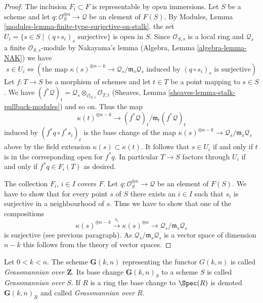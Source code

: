 \begin{proof}
\medskip\noindent
The inclusion $F_i \subset F$ is representable by open immersions.
Let $S$ be a scheme and let
$q : \mathcal{O}_S^{\oplus n} \to \mathcal{Q}$ be an element of
$F(S)$. By
Modules, Lemma \ref{modules-lemma-finite-type-surjective-on-stalk}.
the set $U_i = \{s \in S \mid (q \circ s_i)_s\text{ surjective}\}$
is open in $S$. Since $\mathcal{O}_{S, s}$ is a local ring
and $\mathcal{Q}_s$ a finite $\mathcal{O}_{S, s}$-module
by Nakayama's lemma (Algebra, Lemma \ref{algebra-lemma-NAK}) we have
$$
s \in U_i \Leftrightarrow
\left(
\text{the map }
\kappa(s)^{\oplus n - k} \to \mathcal{Q}_s/\mathfrak m_s\mathcal{Q}_s
\text{ induced by }
(q \circ s_i)_s
\text{ is surjective}
\right)
$$
Let $f : T \to S$ be a morphism of schemes and let $t \in T$ be a point
mapping to $s \in S$. We have
$(f^*\mathcal{Q})_t =
\mathcal{Q}_s \otimes_{\mathcal{O}_{S, s}} \mathcal{O}_{T, t}$
(Sheaves, Lemma \ref{sheaves-lemma-stalk-pullback-modules})
and so on. Thus the map
$$
\kappa(t)^{\oplus n - k} \to (f^*\mathcal{Q})_t/\mathfrak m_t(f^*\mathcal{Q})_t
$$
induced by $(f^*q \circ f^*s_i)_t$ is the base change of the map
$\kappa(s)^{\oplus n - k} \to \mathcal{Q}_s/\mathfrak m_s\mathcal{Q}_s$
above by the field extension $\kappa(s) \subset \kappa(t)$. It follows
that $s \in U_i$ if and only if $t$ is in the corresponding open
for $f^*q$. In particular $T \to S$ factors through $U_i$ if
and only if $f^*q \in F_i(T)$ as desired.

\medskip\noindent
The collection $F_i$, $i \in I$ covers $F$. Let
$q : \mathcal{O}_S^{\oplus n} \to \mathcal{Q}$ be an element of
$F(S)$. We have to show that for every point $s$ of $S$ there exists
an $i \in I$ such that $s_i$ is surjective in a neighbourhood of $s$.
Thus we have to show that one of the compositions
$$
\kappa(s)^{\oplus n - k} \xrightarrow{s_i}
\kappa(s)^{\oplus n} \rightarrow
\mathcal{Q}_s/\mathfrak m_s\mathcal{Q}_s
$$
is surjective (see previous paragraph). As
$\mathcal{Q}_s/\mathfrak m_s\mathcal{Q}_s$ is a vector space of
dimension $n - k$ this follows from the theory of vector spaces.
\end{proof}

\begin{definition}
\label{definition-grassmannian}
Let $0 < k < n$. The scheme $\mathbf{G}(k, n)$ representing the functor
$G(k, n)$ is called {\it Grassmannian over $\mathbf{Z}$}.
Its base change $\mathbf{G}(k, n)_S$ to a scheme $S$ is called
{\it Grassmannian over $S$}. If $R$ is a ring the base change
to $\Spec(R)$ is denoted $\mathbf{G}(k, n)_R$ and called
{\it Grassmannian over $R$}.
\end{definition}

